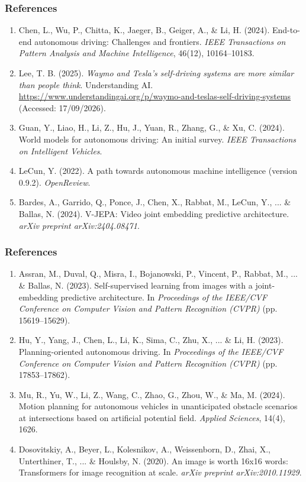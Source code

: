 \begin{frame}
  \frametitle{References}
  \begin{enumerate}
    \item[\hypertarget{ref:1}{[1]}] Chen, L., Wu, P., Chitta, K., Jaeger, B., Geiger, A., \& Li, H. (2024). End-to-end autonomous driving: Challenges and frontiers. \textit{IEEE Transactions on Pattern Analysis and Machine Intelligence}, 46(12), 10164--10183.
    \item[\hypertarget{ref:2}{[2]}] Lee, T. B. (2025). \textit{Waymo and Tesla's self-driving systems are more similar than people think}. Understanding AI. \url{https://www.understandingai.org/p/waymo-and-teslas-self-driving-systems} (Accessed: 17/09/2026).
    \item[\hypertarget{ref:3}{[3]}] Guan, Y., Liao, H., Li, Z., Hu, J., Yuan, R., Zhang, G., \& Xu, C. (2024). World models for autonomous driving: An initial survey. \textit{IEEE Transactions on Intelligent Vehicles}.
    \item[\hypertarget{ref:4}{[4]}] LeCun, Y. (2022). A path towards autonomous machine intelligence (version 0.9.2). \textit{OpenReview}.
    \item[\hypertarget{ref:5}{[5]}] Bardes, A., Garrido, Q., Ponce, J., Chen, X., Rabbat, M., LeCun, Y., ... \& Ballas, N. (2024). V-JEPA: Video joint embedding predictive architecture. \textit{arXiv preprint arXiv:2404.08471}.
  \end{enumerate}
\end{frame}

\begin{frame}
  \frametitle{References}
  \begin{enumerate}
    \item[\hypertarget{ref:6}{[6]}] Assran, M., Duval, Q., Misra, I., Bojanowski, P., Vincent, P., Rabbat, M., ... \& Ballas, N. (2023). Self-supervised learning from images with a joint-embedding predictive architecture. In \textit{Proceedings of the IEEE/CVF Conference on Computer Vision and Pattern Recognition (CVPR)} (pp. 15619--15629).
    \item[\hypertarget{ref:7}{[7]}] Hu, Y., Yang, J., Chen, L., Li, K., Sima, C., Zhu, X., ... \& Li, H. (2023). Planning-oriented autonomous driving. In \textit{Proceedings of the IEEE/CVF Conference on Computer Vision and Pattern Recognition (CVPR)} (pp. 17853--17862).
    \item[\hypertarget{ref:8}{[8]}] Mu, R., Yu, W., Li, Z., Wang, C., Zhao, G., Zhou, W., \& Ma, M. (2024). Motion planning for autonomous vehicles in unanticipated obstacle scenarios at intersections based on artificial potential field. \textit{Applied Sciences}, 14(4), 1626.
    \item[\hypertarget{ref:9}{[9]}] Dosovitskiy, A., Beyer, L., Kolesnikov, A., Weissenborn, D., Zhai, X., Unterthiner, T., ... \& Houlsby, N. (2020). An image is worth 16x16 words: Transformers for image recognition at scale. \textit{arXiv preprint arXiv:2010.11929}.
  \end{enumerate}
\end{frame}

